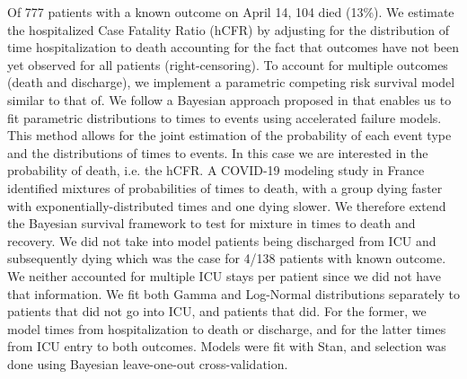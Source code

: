 Of 777 patients with a known outcome on April 14, 104 died (13\%). 
We estimate the hospitalized Case Fatality Ratio (hCFR) by adjusting for the distribution of time hospitalization to death accounting for the fact that outcomes have not been yet observed for all patients (right-censoring). To account for multiple outcomes (death and discharge), we implement a parametric competing risk survival model similar to that of\cite{Ghani:MethodsEstimatingCase:2005}. We follow a Bayesian approach proposed in\cite{Bellot:TreebasedBayesianMixture:2018} that enables us to fit parametric distributions to times to events using accelerated failure models. This method allows for the joint estimation of the probability of each event type and the distributions of times to events. In this case we are interested in the probability of death, i.e. the hCFR. A COVID-19 modeling study in France identified mixtures of probabilities of times to death, with a group dying faster with exponentially-distributed times and one dying slower\cite{Salje:EstimatingBurdenSARSCoV2:2020}. We therefore extend the Bayesian survival framework to test for mixture in times to death and recovery. We did not take into model patients being discharged from ICU and subsequently dying which was the case for 4/138 patients with known outcome. We neither accounted for multiple ICU stays per patient since we did not have that information. We fit both Gamma and Log-Normal distributions separately to patients that did not go into ICU, and patients that did. For the former, we model times from hospitalization to death or discharge, and for the latter times from ICU entry to both outcomes. Models were fit with Stan\cite{Carpenter:StanProbabilisticProgramming:2017}, and selection was done using Bayesian leave-one-out cross-validation\cite{Vehtari:PracticalBayesianModel:2017}. \\
